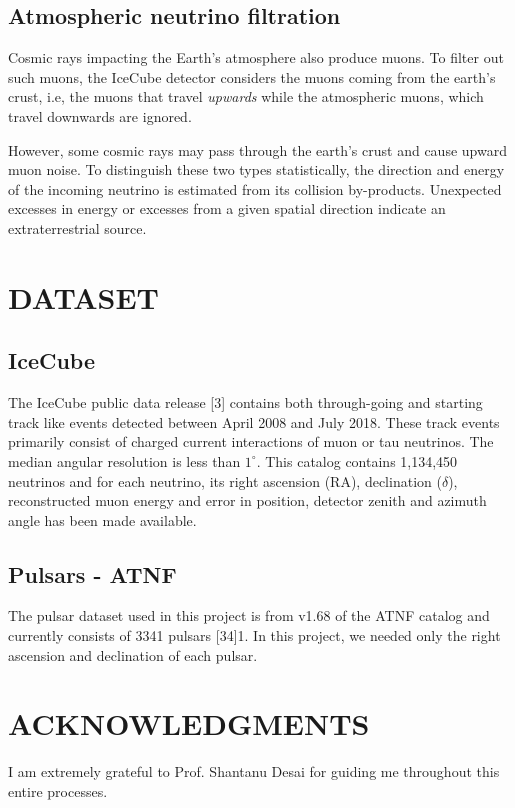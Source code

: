\documentclass{report}
\begin{document}
\subsection{Atmospheric neutrino filtration}
Cosmic rays impacting the Earth's atmosphere also produce muons. To filter out such muons, the IceCube detector considers the muons coming from the earth's crust, i.e, the muons that travel \emph{upwards} while the atmospheric muons, which travel downwards are ignored.

However, some cosmic rays may pass through the earth's crust and cause upward muon noise. To distinguish these two types statistically, the direction and energy of the incoming neutrino is estimated from its collision by-products. Unexpected excesses in energy or excesses from a given spatial direction indicate an extraterrestrial source.

\newpage
\section{DATASET}
\subsection{IceCube}
The IceCube public data release [3] contains both through-going and starting track like events detected between April 2008 and July 2018. %
These track events primarily consist of charged current interactions of muon or tau neutrinos.
The median angular resolution is less than $1^\circ$. This catalog contains 1,134,450 neutrinos and for each neutrino, its right ascension (RA), declination ($\delta$), reconstructed muon energy and error in position, detector zenith and azimuth angle has been made available.
\subsection{Pulsars - ATNF}
The pulsar dataset used in this project is from v1.68 of the ATNF catalog and currently consists of 3341 pulsars [34]1. In this project, we needed only the right ascension and declination of each pulsar.
\newpage
\section{ACKNOWLEDGMENTS}
I am extremely grateful to Prof. Shantanu Desai for guiding me throughout this entire processes. %
\newpage
%  

\end{document}
